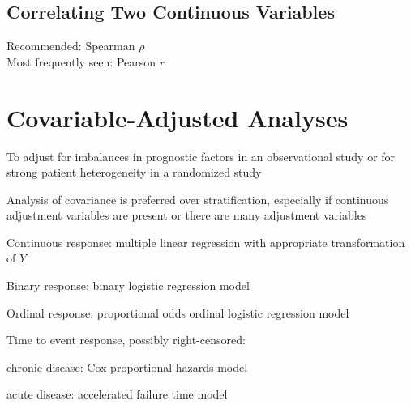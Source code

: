 \subsection{Correlating Two Continuous Variables}
Recommended: Spearman $\rho$ \\
Most frequently seen: Pearson $r$

\section{Covariable-Adjusted Analyses}
\bi
\item To adjust for imbalances in prognostic factors in an
  observational study or for strong patient heterogeneity in a
  randomized study
\item Analysis of covariance is preferred over stratification,
  especially if continuous adjustment variables are present or there
  are many adjustment variables
 \bi
 \item Continuous response: multiple linear regression with
   appropriate transformation of $Y$
 \item Binary response: binary logistic regression model
 \item Ordinal response: proportional odds ordinal logistic regression
   model
 \item Time to event response, possibly right-censored: 
  \bi
  \item chronic disease: Cox proportional hazards model
  \item acute disease: accelerated failure time model
  \ei
 \ei
\ei
